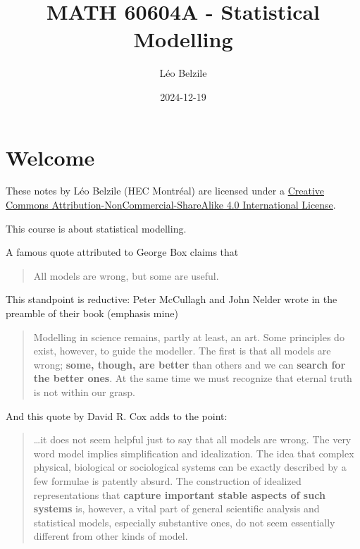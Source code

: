\documentclass[
  11pt,
  letterpaper,
]{scrbook}
\title{MATH 60604A - Statistical Modelling}
\author{Léo Belzile}
\date{2024-12-19}
\renewcommand*\contentsname{Table of contents}
\newcommand\contentsname{Table of contents}
\theoremstyle{plain}
\theoremstyle{definition}
\theoremstyle{definition}
\theoremstyle{plain}
\theoremstyle{remark}
\begin{document}


\renewcommand*\contentsname{Table of contents}
{
\setcounter{tocdepth}{2}
\tableofcontents
}

\mainmatter
{}

\chapter*{Welcome}\label{welcome}


These notes by Léo Belzile (HEC Montréal) are licensed under a
\href{http://creativecommons.org/licenses/by-nc-sa/4.0/}{Creative
Commons Attribution-NonCommercial-ShareAlike 4.0 International License}.

This course is about statistical modelling.

A famous quote attributed to George Box claims that

\begin{quote}
All models are wrong, but some are useful.
\end{quote}

This standpoint is reductive: Peter McCullagh and John Nelder wrote in
the preamble of their book (emphasis mine)

\begin{quote}
Modelling in science remains, partly at least, an art. Some principles
do exist, however, to guide the modeller. The first is that all models
are wrong; \textbf{some, though, are better} than others and we can
\textbf{search for the better ones}. At the same time we must recognize
that eternal truth is not within our grasp.
\end{quote}

And this quote by David R. Cox adds to the point:

\begin{quote}
\ldots it does not seem helpful just to say that all models are wrong.
The very word model implies simplification and idealization. The idea
that complex physical, biological or sociological systems can be exactly
described by a few formulae is patently absurd. The construction of
idealized representations that \textbf{capture important stable aspects
of such systems} is, however, a vital part of general scientific
analysis and statistical models, especially substantive ones, do not
seem essentially different from other kinds of model.
\end{quote}
\end{document}
